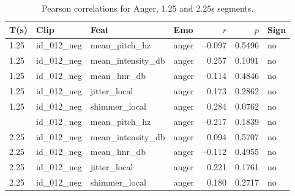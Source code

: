   \begin{table}[ht]
    \centering
    
      \caption{Pearson correlations for Anger, 1.25 and 2.25s segments.}
      \label{tab:pearson_anger_125_225s}
      \begin{tabular}{l l l l r r l}
        \toprule
        T(s) & Clip           & Feat             & Emo & $r$ & $p$ & Sign\\
        \midrule
        1.25  & id\_012\_neg & mean\_pitch\_hz     & anger   & –0.097      & 0.5496    & no  \\
        1.25  & id\_012\_neg & mean\_intensity\_db & anger   &  0.257      & 0.1091    & no  \\
        1.25  & id\_012\_neg & mean\_hnr\_db       & anger   & –0.114      & 0.4846    & no  \\
        1.25  & id\_012\_neg & jitter\_local       & anger   &  0.173      & 0.2862    & no  \\
        1.25  & id\_012\_neg & shimmer\_local      & anger   &  0.284      & 0.0762    & no  \\
        \addlinespace
        2.25  & id\_012\_neg & mean\_pitch\_hz     & anger   & –0.217      & 0.1839    & no  \\
        2.25  & id\_012\_neg & mean\_intensity\_db & anger   &  0.094      & 0.5707    & no  \\
        2.25  & id\_012\_neg & mean\_hnr\_db       & anger   & –0.112      & 0.4955    & no  \\
        2.25  & id\_012\_neg & jitter\_local       & anger   &  0.221      & 0.1761    & no  \\
        2.25  & id\_012\_neg & shimmer\_local      & anger   &  0.180      & 0.2717    & no  \\
        \bottomrule
      \end{tabular}
    \end{table}%
    \hfill

